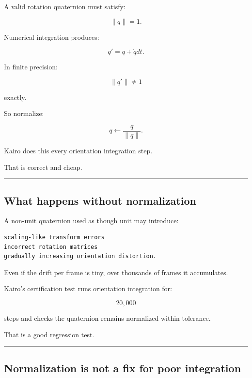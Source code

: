 A valid rotation quaternion must satisfy:

\[
\|q\|=1.
\]

Numerical integration produces:

\[
q'
=
q+\dot qdt.
\]

In finite precision:

\[
\|q'\|
\neq1
\]

exactly.

So normalize:

\[
\boxed{
q
\leftarrow
\frac{q}{\|q\|}.
}
\]

Kairo does this every orientation integration step.

That is correct and cheap.

\begin{center}\rule{0.5\linewidth}{0.5pt}\end{center}

\subsection{What happens without normalization}\label{06-engine-ii-ch037-what-happens-without-normalization}

\hypertarget{06-engine-ii-ch037-what-happens-without-normalization}{}

A non-unit quaternion used as though unit may introduce:

\begin{verbatim}
scaling-like transform errors
incorrect rotation matrices
gradually increasing orientation distortion.
\end{verbatim}

Even if the drift per frame is tiny, over thousands of frames it accumulates.

Kairo's certification test runs orientation integration for:

\[
20,000
\]

steps and checks the quaternion remains normalized within tolerance.

That is a good regression test.

\begin{center}\rule{0.5\linewidth}{0.5pt}\end{center}

\subsection{Normalization is not a fix for poor integration}\label{06-engine-ii-ch037-normalization-is-not-a-fix-for-poor-integration}

